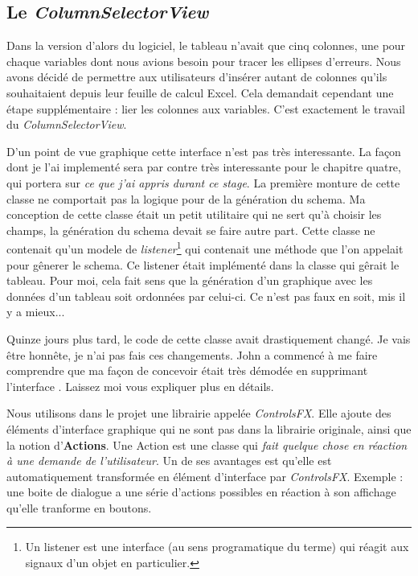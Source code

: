 %
%
\subsection{Le \textit{ColumnSelectorView}}
Dans la version d'alors du logiciel, le tableau n'avait que cinq colonnes, une pour chaque variables dont nous avions besoin pour tracer les ellipses d'erreurs. Nous avons décidé de permettre aux utilisateurs d'insérer autant de colonnes qu'ils souhaitaient depuis leur feuille de calcul Excel. Cela demandait cependant une étape supplémentaire : lier les colonnes aux variables. C'est exactement le travail du \textit{ColumnSelectorView}. 


D'un point de vue graphique cette interface n'est pas très interessante. La façon dont je l'ai implementé sera par contre très interessante pour le chapitre quatre, qui portera sur \textit{ce que j'ai appris durant ce stage}. La première monture de cette classe ne comportait pas la logique pour de la génération du schema. Ma conception de cette classe était un petit utilitaire qui ne sert qu'à choisir les champs, la génération du schema devait se faire autre part. Cette classe ne contenait qu'un modele de \textit{listener}\footnote{Un listener est une interface (au sens programatique du terme) qui réagit aux signaux d'un objet en particulier.} qui contenait une méthode que l'on appelait pour gênerer le schema. Ce listener était implémenté dans la classe qui gêrait le tableau. Pour moi, cela fait sens que la génération d'un graphique avec les données d'un tableau soit ordonnées par celui-ci. Ce n'est pas faux en soit, mis il y a mieux...


Quinze jours plus tard, le code de cette classe avait drastiquement changé. Je vais être honnête, je n'ai pas fais ces changements. John a commencé à me faire comprendre que ma façon de concevoir était très démodée en supprimant l'interface %
. Laissez moi vous expliquer plus en détails.

Nous utilisons dans le projet une librairie appelée \textit{ControlsFX}. Elle ajoute des éléments d'interface graphique qui ne sont pas dans la librairie originale, ainsi que la notion d'\textbf{Actions}. Une Action est une classe qui \textit{fait quelque chose en réaction à une demande de l'utilisateur}. Un de ses avantages est qu'elle est automatiquement transformée en élément d'interface par \textit{ControlsFX}. Exemple : une boite de dialogue a une série d'actions possibles en réaction à son affichage qu'elle tranforme en boutons.

